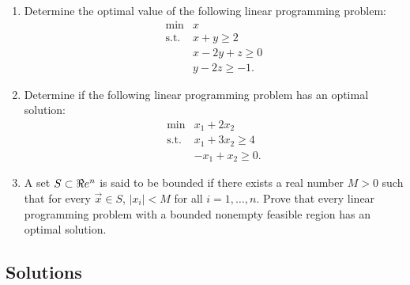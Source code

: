 \begin{enumerate}
\def\labelenumi{\arabic{enumi}.}
\item
  Determine the optimal value of the following linear programming
  problem: \[
  \begin{array}{rl}
  \min & x \\
  \text{s.t.}
  & x + y  \geq 2 \\
  & x - 2y + z \geq 0 \\
  &   y - 2z \geq -1.
  \end{array}
  \]
\item
  Determine if the following linear programming problem has an optimal
  solution: \[
  \begin{array}{rl}
  \min & x_1 + 2x_2 \\
  \text{s.t.}
  & x_1 + 3x_2  \geq 4 \\
  & -x_1 + x_2  \geq 0.
  \end{array}
  \]
\item
  A set \(S \subset \Re e^n\) is said to be bounded if there exists a real
  number \(M \gt 0\) such that for every \(\vec{x} \in S\),
  \(|x_i| \lt M\) for all \(i = 1,\ldots, n\). Prove that every linear
  programming problem with a bounded nonempty feasible region has an
  optimal solution.
\end{enumerate}

\subsection*{Solutions}\label{solutions-5}

